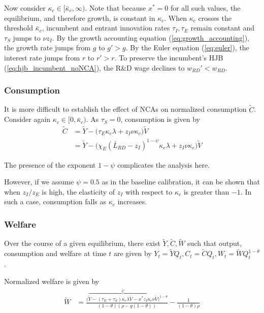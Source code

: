 \documentclass[11pt,english]{article}
\theoremstyle{remark}
\begin{document}
Now consider $\kappa_c \in [\bar{\kappa}_c,\infty)$. Note that because $x^* = 0$ for all such values, the equilibrium, and therefore growth, is constant in $\kappa_c$. When $\kappa_c$ crosses the threshold $\bar{\kappa}_c$, incumbent and entrant innovation rates $\tau_I,\tau_E$ remain constant and $\tau_S$ jumps to $\nu z_I$. By the growth accounting equation (\ref{eq:growth_accounting}), the growth rate jumps from $g$ to $g' > g$. By the Euler equation (\ref{eq:euler}), the interest rate jumps from $r$ to $r'>r$. To preserve the incumbent's HJB (\ref{eq:hjb_incumbent_noNCA}), the R\&D wage declines to $w_{RD}' < w_{RD}$.


\subsubsection{Consumption}\label{cs:consumption1}

It is more difficult to establish the effect of NCAs on normalized consumption $\tilde{C}$. Consider again $\kappa_c \in [0, \bar{\kappa}_c)$. As $\tau_S = 0$, consumption is given by 
\begin{align}
\tilde{C} &= \tilde{Y} - \Big( \tau_E  \kappa_e \lambda + z_I \nu \kappa_c \Big) \tilde{V} \\
&= \tilde{Y} - \Big( \chi_E (\bar{L}_{RD} - z_I)^{1-\psi} \kappa_e \lambda + z_I \nu \kappa_c \Big) \tilde{V} \label{cs:consumption_eq}
\end{align}

The presence of the exponent $1-\psi$ complicates the analysis here. 

However, if we assume $\psi = 0.5$ as in the baseline calibration, it can be shown that when $z_I / z_E$ is high, the elasticity of $z_I$ with respect to $\kappa_c$ is greater than $-1$. In such a case, consumption falls as $\kappa_c$ increases. 

\subsubsection{Welfare}

Over the course of a given equilibrium, there exist $\tilde{Y},\tilde{C},\tilde{W}$ such that output, consumption and welfare at time $t$ are given by $Y_t = \tilde{Y} Q_t, C_t = \tilde{C} Q_t, W_t = \tilde{W} Q_t^{1-\theta}$. 

Normalized welfare is given by 
\begin{align}
\tilde{W} &= \frac{\big(\overbrace{\tilde{Y} - (\tau_E + \tau_S) \kappa_{e} \lambda \tilde{V} - x^* z_I \kappa_c \nu \tilde{V}}^{\tilde{C}}\big)^{1-\theta}}{(1-\theta)(\rho - g(1-\theta))} - \frac{1}{(1-\theta)\rho}  \label{eq:agg_welfare}
\end{align}
\end{document}
